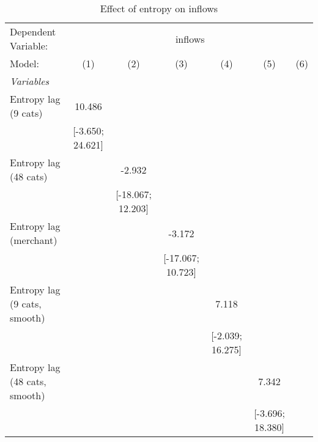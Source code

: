
\begin{table}[htbp]
   \centering
   \tiny
   \begin{threeparttable}[b]
      \caption{\label{tab:reg_inflows_lag_cnz} Effect of entropy on inflows}
      \begin{tabular}{lcccccc}
         \tabularnewline \midrule \midrule
         Dependent Variable: & \multicolumn{6}{c}{inflows}\\
         Model:                         & (1)                  & (2)                  & (3)                  & (4)                  & (5)                  & (6)\\  
         \midrule
         \emph{Variables}\\
         Entropy lag (9 cats)           & 10.486               &                      &                      &                      &                      &   \\   
                                        & [-3.650; 24.621]     &                      &                      &                      &                      &   \\   
         Entropy lag (48 cats)          &                      & -2.932               &                      &                      &                      &   \\   
                                        &                      & [-18.067; 12.203]    &                      &                      &                      &   \\   
         Entropy lag (merchant)         &                      &                      & -3.172               &                      &                      &   \\   
                                        &                      &                      & [-17.067; 10.723]    &                      &                      &   \\   
         Entropy lag (9 cats, smooth)   &                      &                      &                      & 7.118                &                      &   \\   
                                        &                      &                      &                      & [-2.039; 16.275]     &                      &   \\   
         Entropy lag (48 cats, smooth)  &                      &                      &                      &                      & 7.342                &   \\   
                                        &                      &                      &                      &                      & [-3.696; 18.380]     &   \\   

\end{tabular}
\end{threeparttable}
\end{table}
